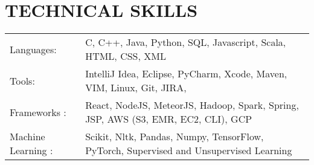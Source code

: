 \documentclass[letterpaper, 10pt, oneside]{article}
\newcommand{\sectionspace}{\vspace{-1em}}
\begin{document}
\vspace{-0.5em}



\sectionspace
\section{\color{headings} \large\textbf{TECHNICAL SKILLS}}
\vspace{-0.8em}
\color{text1}
\raggedright
\begin{tabular}{l l}
Languages: & C, C++, Java, Python, SQL, Javascript, Scala, HTML, CSS, XML\\
Tools: & IntelliJ Idea, Eclipse, PyCharm, Xcode, Maven, VIM, Linux, Git, JIRA,  \\
Frameworks : &React, NodeJS, MeteorJS, Hadoop, Spark, Spring, JSP, AWS (S3, EMR, EC2, CLI),  GCP\\
Machine Learning : & Scikit, Nltk, Pandas, Numpy, TensorFlow, PyTorch, Supervised and Unsupervised Learning
\end{tabular}

\sectionspace
\vspace{0.1em}
\end{document}
